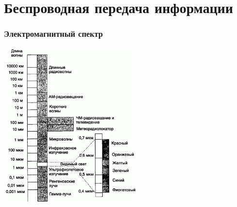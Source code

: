 \documentclass[utf8]{beamer}
\begin{document}
\section{Беспроводная передача информации}
\begin{frame}
\frametitle{Электромагнитный спектр}
\begin{center}
\includegraphics[width=0.55\textwidth]{pics/spectrum.png}
\end{center}
\end{frame}
\end{document}
